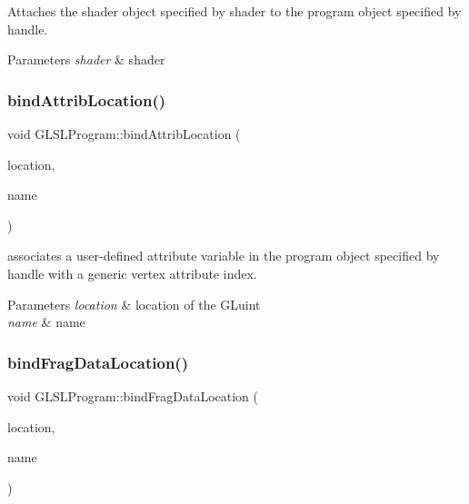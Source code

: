 Attaches the shader object specified by shader to the program object specified by handle. 


\begin{DoxyParams}{Parameters}
{\em shader} & shader \\
\hline
\end{DoxyParams}
\hypertarget{class_g_l_s_l_program_a54589ae245f6fac51f79a6617c91240b}{}\label{class_g_l_s_l_program_a54589ae245f6fac51f79a6617c91240b} 
\subsubsection{\texorpdfstring{bind\+Attrib\+Location()}{bindAttribLocation()}}
{\footnotesize\ttfamily void G\+L\+S\+L\+Program\+::bind\+Attrib\+Location (\begin{DoxyParamCaption}\item[{G\+Luint}]{location,  }\item[{const char $\ast$}]{name }\end{DoxyParamCaption})}



associates a user-\/defined attribute variable in the program object specified by handle with a generic vertex attribute index. 


\begin{DoxyParams}{Parameters}
{\em location} & location of the G\+Luint \\
\hline
{\em name} & name \\
\hline
\end{DoxyParams}
\hypertarget{class_g_l_s_l_program_a44270f942de121ef2493e26f1226a902}{}\label{class_g_l_s_l_program_a44270f942de121ef2493e26f1226a902} 
\subsubsection{\texorpdfstring{bind\+Frag\+Data\+Location()}{bindFragDataLocation()}}
{\footnotesize\ttfamily void G\+L\+S\+L\+Program\+::bind\+Frag\+Data\+Location (\begin{DoxyParamCaption}\item[{G\+Luint}]{location,  }\item[{const char $\ast$}]{name }\end{DoxyParamCaption})}



